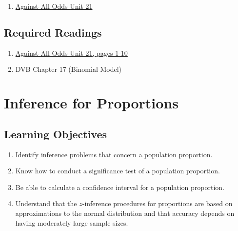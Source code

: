 \documentclass[letterpaper,10pt,twocolumn,twoside,]{pinp}
\providecommand{\tightlist}{%
  \setlength{\itemsep}{0pt}\setlength{\parskip}{0pt}}
\begin{document}
\begin{enumerate}
\def\labelenumi{\arabic{enumi}.}
\tightlist
\item
  \href{https://www.learner.org/series/against-all-odds-inside-statistics/binomial-distributions/}{Against
  All Odds Unit 21}
\end{enumerate}

\hypertarget{required-readings-3}{%
\subsection{Required Readings}\label{required-readings-3}}

\begin{enumerate}
\item \href{https://www.learner.org/wp-content/uploads/2019/03/AgainstAllOdds_StudentGuide_Unit21-Binomial-Distributions.pdf}{Against All Odds Unit 21, pages 1-10}
\item DVB Chapter 17 (Binomial Model)
\end{enumerate}

\vspace*{0.25cm}

\hypertarget{inference-for-proportions}{%
\section{Inference for Proportions}\label{inference-for-proportions}}

\hypertarget{learning-objectives-4}{%
\subsection{Learning Objectives}\label{learning-objectives-4}}

\begin{enumerate}
\def\labelenumi{\arabic{enumi}.}
\tightlist
\item
  Identify inference problems that concern a population proportion.
\item
  Know how to conduct a significance test of a population proportion.
\item
  Be able to calculate a confidence interval for a population
  proportion.
\item
  Understand that the \(z\)-inference procedures for proportions are
  based on approximations to the normal distribution and that accuracy
  depends on having moderately large sample sizes.
\end{enumerate}
\end{document}
